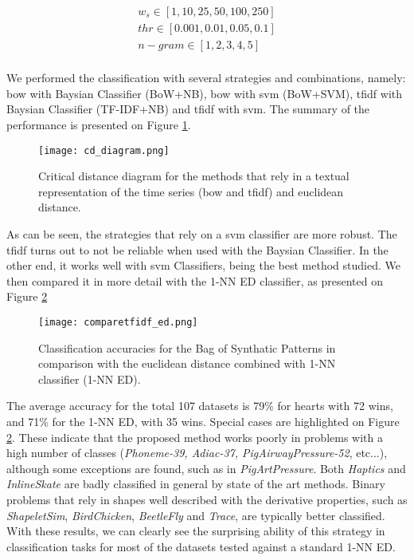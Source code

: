 \begin{equation}
\begin{gathered}
w_s \in [1, 10, 25, 50, 100, 250]\\
thr \in [0.001, 0.01, 0.05, 0.1]\\
n-gram \in [1, 2, 3, 4, 5]\\
\end{gathered}
\end{equation}


We performed the classification with several strategies and combinations, namely: \gls{bow} with Baysian Classifier (BoW+NB), \gls{bow} with \gls{svm} (BoW+SVM), \gls{tfidf} with Baysian Classifier (TF-IDF+NB) and \gls{tfidf} with \gls{svm}. The summary of the performance is presented on Figure \ref{fig:cd_diagram}.

\begin{figure}
    \centering
    \texttt{[image: cd\_diagram.png]}
    \caption{Critical distance diagram for the methods that rely in a textual representation of the time series (\gls{bow} and \gls{tfidf}) and euclidean distance.}
    \label{fig:cd_diagram}
\end{figure}

As can be seen, the strategies that rely on a \gls{svm} classifier are more robust. The \gls{tfidf} turns out to not be reliable when used with the Baysian Classifier. In the other end, it works well with \gls{svm} Classifiers, being the best method studied. We then compared it in more detail with the 1-NN ED classifier, as presented on Figure \ref{fig:comparison_1}

\begin{figure}[h]
    \centering
    \texttt{[image: comparetfidf\_ed.png]}
    \caption{Classification accuracies for the Bag of Synthatic Patterns in comparison with the euclidean distance combined with 1-NN classifier (1-NN ED).}
    \label{fig:comparison_1}
\end{figure}

The average accuracy for the total 107 datasets is 79\% for \gls{hearts} with 72 wins, and 71\% for the 1-NN ED, with 35 wins. Special cases are highlighted on Figure \ref{fig:comparison_1}. These indicate that the proposed method works poorly in problems with a high number of classes (\textit{Phoneme-39, Adiac-37, PigAirwayPressure-52}, etc...), although some exceptions are found, such as in \textit{PigArtPressure}. Both \textit{Haptics} and \textit{InlineSkate} are badly classified in general by state of the art methods. Binary problems that rely in shapes well described with the derivative properties, such as \textit{ShapeletSim}, \textit{BirdChicken}, \textit{BeetleFly} and \textit{Trace}, are typically better classified. With these results, we can clearly see the surprising ability of this strategy in classification tasks for most of the datasets tested against a standard 1-NN ED.

